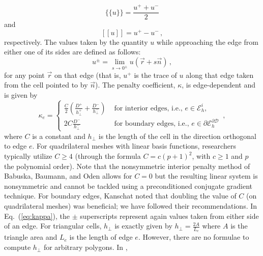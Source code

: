\documentclass[preprint,10pt]{elsarticle}
\newcommand{\jmp}[1]{[\![#1]\!]}                     %
\newcommand{\mvl}[1]{\{\!\!\{#1\}\!\!\}}             %
\newcommand{\D}{\mathcal{D}}
\newcommand{\vr}{\vec{r}}
\newcommand{\vn}{\vec{n}}
\newcommand{\EI}{\mathcal{E}_h^i}
\newcommand{\eqt}[1]{Eq.~(\ref{#1})}                     %
\newcommand{\tf}{b}
\begin{document}
\begin{equation} \label{eq:mean}
\mvl{u} = \frac{u^+ + u^-}{2}
\end{equation}
and
\begin{equation} \label{eq:jump}
\jmp{u} = u^+ - u^- \, ,
\end{equation}
respectively.  The values taken by the quantity $u$ while approaching the edge from either one of its sides are defined as follows:
\begin{equation} \label{eq:upm}
u^\pm = \lim_{s\to 0^\pm} u(\vr + s \vn) \, ,
\end{equation}
for any point $\vr$ on that edge (that is, $u^+$ is the trace of $u$ along that edge taken from the cell pointed to by $\vn$).
%
The penalty coefficient, $\kappa$, is edge-dependent and is given by
\begin{equation} \label{eq:kappa}
  \kappa_e = \left\{
    \begin{array}{ll}
      \frac{C}{2} \left( \frac{D^+}{h_\bot^+} + \frac{D^-}{h_\bot^-} \right) & \textrm{ for interior edges, i.e., } e \in \EI,\\
      2C \frac{D^-}{h_\bot^-}  & \textrm{ for boundary edges, i.e., } e \in \partial \mathcal{E}_h^{\partial\D}
    \end{array}
    \right. \, ,
\end{equation}
where $C$ is a constant and $h_{\bot}$ is the length of the cell in the direction 
orthogonal to edge $e$. 
For quadrilateral meshes with linear basis functions, researchers typically utilize $C \ge 4$ 
(through the formula $C=c(p+1)^2$, with $c\ge 1$ and $p$ the polynomial order).  %
Note that the nonsymmetric interior penalty method of Babuska, Baumann, and Oden \cite{Babuska1999103}
allows for $C=0$ but the resulting linear system is nonsymmetric and cannot be tackled using a 
preconditioned conjugate gradient technique.
For boundary edges, 
Kanschat \cite{Kanschat2007} noted that doubling the value of $C$ (on quadrilateral meshes) was 
beneficial; we have followed their recommendations. In \eqt{eq:kappa}, the $\pm$ superscripts 
represent again values taken from either side of an edge. For triangular cells, $h_\bot$ is exactly 
given by $h_{\bot}=\frac{2A}{L_e}$ where $A$ is the triangle area and $L_e$ is the length of edge $e$. 
However, there are no formulae to compute $h_{\bot}$ for arbitrary polygons. In \cite{BT-PhD}, 
\end{document}
